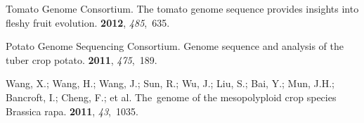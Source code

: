 \documentclass[applsci,article,accept,moreauthors,pdftex]{Definitions/mdpi}
\begin{document}
{%









\begin{thebibliography}{999}

Tomato Genome Consortium.
\newblock The tomato genome sequence provides insights into fleshy fruit
  evolution.
 {\bf 2012}, {\em 485},~635.

Potato Genome Sequencing Consortium.
\newblock Genome sequence and analysis of the tuber crop potato.
 {\bf 2011}, {\em 475},~189.

Wang, X.; Wang, H.; Wang, J.; Sun, R.; Wu, J.; Liu, S.; Bai, Y.; Mun, J.H.;
  Bancroft, I.; Cheng, F.; et al.
\newblock The~genome of the mesopolyploid crop species Brassica rapa.
 {\bf 2011}, {\em 43},~1035.


\end{thebibliography}}
\end{document}

